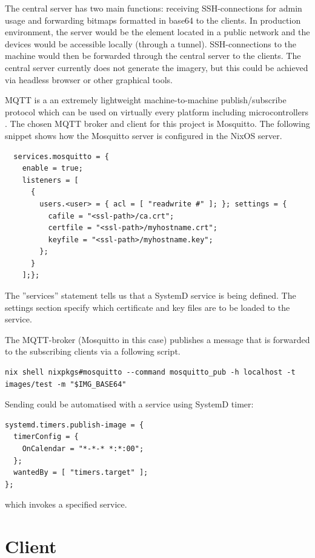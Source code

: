 The central server has two main functions: receiving SSH-connections
for admin usage and forwarding bitmaps formatted in base64 to the
clients. In production environment, the server would be the element
located in a public network and the devices would be accessible
locally (through a tunnel). SSH-connections to the machine would then
be forwarded through the central server to the clients. The central
server currently does not generate the imagery, but this could be
achieved via headless browser or other graphical tools.

MQTT is a an extremely lightweight machine-to-machine publish/subscribe
protocol which can be used on virtually every platform including
microcontrollers \cite{oasisopenMQTTVersion}. The chosen MQTT broker
and client for this project is Mosquitto. The following snippet shows
how the Mosquitto server is configured in the NixOS server.
\begin{lstlisting}
  services.mosquitto = {
    enable = true;
    listeners = [
      {
        users.<user> = { acl = [ "readwrite #" ]; }; settings = {
          cafile = "<ssl-path>/ca.crt";
          certfile = "<ssl-path>/myhostname.crt";
          keyfile = "<ssl-path>/myhostname.key";
        };
      }
    ];};
\end{lstlisting}

The ''services'' statement tells us that a SystemD service is being
defined. The settings section specify which certificate and key files
are to be loaded to the service.

The MQTT-broker (Mosquitto in this case) publishes a message that is
forwarded to the subscribing clients via a following script.

\begin{lstlisting}
nix shell nixpkgs#mosquitto --command mosquitto_pub -h localhost -t
images/test -m "$IMG_BASE64"
\end{lstlisting}

Sending could be automatised with a service using SystemD timer:
\begin{lstlisting}
systemd.timers.publish-image = {
  timerConfig = {
    OnCalendar = "*-*-* *:*:00";
  };
  wantedBy = [ "timers.target" ];
};
\end{lstlisting}

which invokes a specified service.

\section{Client}


